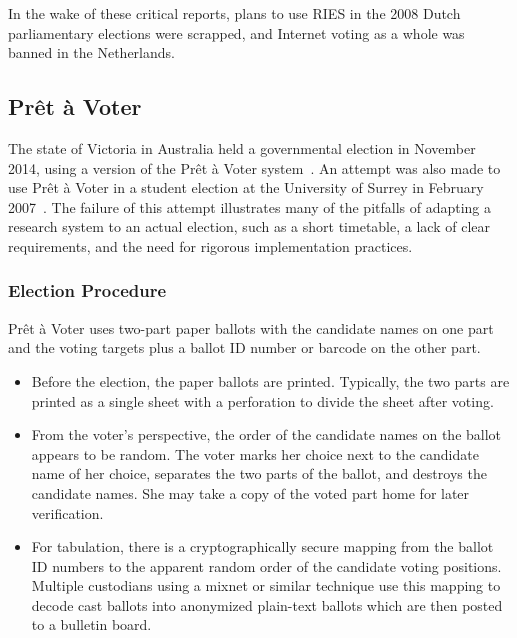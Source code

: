 In the wake of these critical reports, plans to use RIES in the 2008
Dutch parliamentary elections were scrapped, and Internet voting as a
whole was banned in the Netherlands.

\subsection{Prêt à Voter~\cite{chaum2005}}
\label{sec:pret-voter}

The state of Victoria in Australia held a governmental election in
November 2014, using a version of the Prêt à Voter
system~\cite{burton2012}. An attempt was also made to use Prêt à Voter
in a student election at the University of Surrey in February
2007~\cite{bismark2007}. The failure of this attempt illustrates many
of the pitfalls of adapting a research system to an actual election,
such as a short timetable, a lack of clear requirements, and the need
for rigorous implementation practices.

\subsubsection{Election Procedure}

Prêt à Voter uses two-part paper ballots with the candidate names on
one part and the voting targets plus a ballot ID number or barcode on
the other part.

\begin{itemize}

\item Before the election, the paper ballots are printed. Typically,
  the two parts are printed as a single sheet with a perforation to
  divide the sheet after voting.

\item From the voter's perspective, the order of the candidate names
  on the ballot appears to be random. The voter marks her choice next
  to the candidate name of her choice, separates the two parts of the
  ballot, and destroys the candidate names. She may take a copy of the
  voted part home for later verification.

\item For tabulation, there is a cryptographically secure mapping from
  the ballot ID numbers to the apparent random order of the candidate
  voting positions. Multiple custodians using a mixnet or similar
  technique use this mapping to decode cast ballots into anonymized
  plain-text ballots which are then posted to a bulletin board.

\end{itemize}

